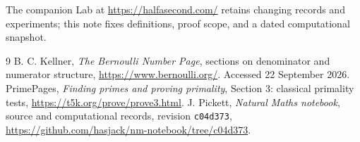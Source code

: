 \documentclass[11pt,a4paper]{article}
\begin{document}
The companion Lab at \url{https://halfasecond.com/} retains changing
records and experiments; this note fixes definitions, proof scope, and a
dated computational snapshot.

\begin{thebibliography}{9}
 B. C. Kellner, \emph{The Bernoulli Number Page},
sections on denominator and numerator structure,
\url{https://www.bernoulli.org/}. Accessed 22 September 2026.
 PrimePages, \emph{Finding primes and proving
primality}, Section 3: classical primality tests,
\url{https://t5k.org/prove/prove3.html}.
 J. Pickett, \emph{Natural Maths notebook}, source and
computational records, revision \texttt{c04d373},
\url{https://github.com/hasjack/nm-notebook/tree/c04d373}.
\end{thebibliography}
\end{document}
